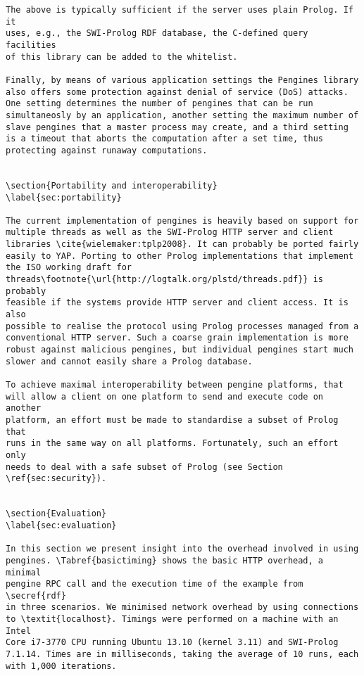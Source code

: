 \documentclass{new_tlp}
\newcommand{\secref}[1]{section~\ref{sec:#1}}
\newcommand{\Tabref}[1]{Table~\ref{tab:#1}}
\begin{document}
\begin{verbatim}
The above is typically sufficient if the server uses plain Prolog. If it
uses, e.g., the SWI-Prolog RDF database, the C-defined query facilities
of this library can be added to the whitelist.

Finally, by means of various application settings the Pengines library also offers some protection against denial of service (DoS) attacks. One setting determines the number of pengines that can be run simultaneosly by an application, another setting the maximum number of slave pengines that a master process may create, and a third setting is a timeout that aborts the computation after a set time, thus protecting against runaway computations.


\section{Portability and interoperability}
\label{sec:portability}

The current implementation of pengines is heavily based on support for
multiple threads as well as the SWI-Prolog HTTP server and client
libraries \cite{wielemaker:tplp2008}. It can probably be ported fairly
easily to YAP. Porting to other Prolog implementations that implement
the ISO working draft for
threads\footnote{\url{http://logtalk.org/plstd/threads.pdf}} is probably
feasible if the systems provide HTTP server and client access. It is also
possible to realise the protocol using Prolog processes managed from a
conventional HTTP server. Such a coarse grain implementation is more
robust against malicious pengines, but individual pengines start much
slower and cannot easily share a Prolog database.

To achieve maximal interoperability between pengine platforms, that
will allow a client on one platform to send and execute code on another
platform, an effort must be made to standardise a subset of Prolog that
runs in the same way on all platforms. Fortunately, such an effort only
needs to deal with a safe subset of Prolog (see Section
\ref{sec:security}).


\section{Evaluation}
\label{sec:evaluation}

In this section we present insight into the overhead involved in using
pengines. \Tabref{basictiming} shows the basic HTTP overhead, a minimal
pengine RPC call and the execution time of the example from \secref{rdf}
in three scenarios. We minimised network overhead by using connections
to \textit{localhost}. Timings were performed on a machine with an Intel
Core i7-3770 CPU running Ubuntu 13.10 (kernel 3.11) and SWI-Prolog
7.1.14. Times are in milliseconds, taking the average of 10 runs, each
with 1,000 iterations.


\end{verbatim}
\end{document}
